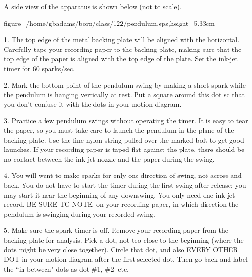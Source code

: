 A side view of the apparatus is shown below (not to scale).
\smallskip
\centerline{\psfig
{figure=/home/gbadams/born/class/122/pendulum.eps,height=5.33cm}}
\item{1.} The top edge of the metal backing plate will be aligned with 
the horizontal.  Carefully tape your recording paper to the backing plate, 
making sure that the top edge of the paper is aligned with the top edge
of the plate.  Set the ink-jet timer for 60 sparks/sec.

\item{2.} Mark the bottom point of the pendulum swing by making a short 
spark while the pendulum is hanging vertically at rest.  Put a square 
around this dot so that you don't confuse it with the dots in your motion 
diagram.  

\item{3.} Practice a few pendulum swings without operating the timer.  
It is easy to tear the paper, so you must take care to launch the 
pendulum in the plane of the backing plate.  Use the fine nylon 
string pulled over the marked bolt to get good launches.  If your 
recording paper is taped flat against the plate, there should be no 
contact between the ink-jet nozzle and the paper during the swing.  

\item{4.} You will want to make sparks for only one direction of 
swing, not across and back.  You do not have to start the timer 
during the first swing after release; you may start it near the 
beginning of any downswing.  You only need one ink-jet record.  
BE SURE TO NOTE, on your recording paper, in which direction the 
pendulum is swinging during your recorded swing.

\item{5.} Make sure the spark timer is off.  Remove your recording 
paper from the backing plate for analysis.  Pick a dot, not too 
close to the beginning (where the dots might be very close together).  
Circle that dot, and also EVERY OTHER DOT in your motion diagram 
after the first selected dot.  Then go back and label the 
``in-between" dots as dot \#1, \#2, etc.

